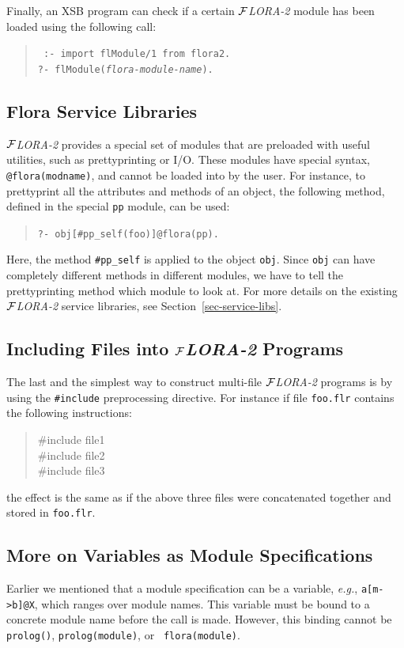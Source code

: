 \documentclass[11pt]{article}
\newcommand{\FLORA}{{\mbox{${\cal F}${\small\it LORA}\rm\emph{-2}}}\xspace}
\begin{document}
Finally, an XSB program can check if a certain \FLORA module has been
loaded using the following call:
\begin{quote}
 \tt
 :- import flModule/1 from flora2.\\
 ?- flModule({\it flora-module-name}).
\end{quote}

\subsection{Flora Service Libraries}

\FLORA provides a special set of modules that are preloaded with useful
utilities, such as prettyprinting or I/O. These modules have special
syntax, {\tt @flora(modname)}, and cannot be loaded into by the user. For
instance, to prettyprint all the attributes and methods of an object, the
following method, defined in the special {\tt pp} module, can be used:
\begin{quote}
 \tt   ?- obj[\#pp\_self(foo)]@flora(pp).
\end{quote}
Here, the method {\tt \#pp\_self} is applied to the object {\tt obj}.
Since {\tt obj} can have completely different methods in different modules,
we have to tell the prettyprinting method which module to look at.  For
more details on the existing \FLORA service libraries, see
Section~\ref{sec-service-libs}.


\subsection{Including Files into \FLORA Programs}

The last and the simplest way to construct multi-file \FLORA 
programs is by using the {\tt \#include} preprocessing directive.
For instance if file {\tt foo.flr} contains the following instructions:
\begin{quote}
  \#include file1 \\
  \#include file2\\
  \#include file3
\end{quote}
the effect is the same as if the above three files were concatenated
together and stored in {\tt foo.flr}.

\subsection{More on Variables as Module Specifications}

Earlier we mentioned that a module specification can be a variable, {\it
  e.g.}, {\tt a[m->b]@X}, which ranges over module names. This variable
must be bound to a concrete module name before the call is made. However,
this binding cannot be {\tt prolog()}, {\tt prolog(module)}, or {\tt
  flora(module)}.
\end{document}
